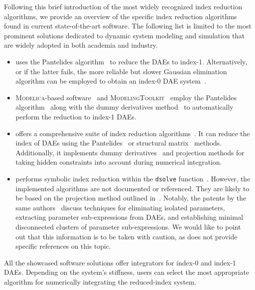 Following this brief introduction of the most widely recognized index reduction algorithms, we provide an overview of the specific index reduction algorithms found in current state-of-the-art software. The following list is limited to the most prominent solutions dedicated to dynamic system modeling and simulation that are widely adopted in both academia and industry.
%
\begin{itemize}
  \setlength{\itemsep}{0.0em}
  \item \Matlab{} uses the Pantelides algorithm~\cite{pantelides1988consistent} to reduce the \acp{DAE} to index-1. Alternatively, or if the latter fails, the more reliable but slower Gaussian elimination algorithm can be employed to obtain an index-0 \ac{DAE} system~\cite{matlab}.
  \item \textsc{Modelica}-based software~\cite{mattsson1997modelica, mattsson1998physical} and \textsc{ModelingToolkit}~\cite{modelingtoolkit} employ the Pantelides algorithm~\cite{pantelides1988consistent} along with the dummy derivatives method~\cite{mattsson1993index} to automatically perform the reduction to index-1 \acp{DAE}.
  \item \Mathematica{} offers a comprehensive suite of index reduction algorithms~\cite{mathematica}. It can reduce the index of \acp{DAE} using the Pantelides~\cite{pantelides1988consistent} or structural matrix~ \cite{unger1995structural, chowdhry2004symbolic} methods. Additionally, it implements dummy derivatives~\cite{mattsson1993index} and projection methods for taking hidden constraints into account during numerical integration.
  \item \Maple{} performs symbolic index reduction within the \texttt{dsolve} function~\cite{maple}. However, the implemented algorithms are not documented or referenced. They are likely to be based on the projection method outlined in~\cite{shmoylova2013simplification}. Notably, the patents by the same authors~\cite{postma2012exact, shmoylova2012method, postma2015exact} discuss techniques for eliminating isolated parameters, extracting parameter sub-expressions from \acp{DAE}, and establishing minimal disconnected clusters of parameter sub-expressions. We would like to point out that this information is to be taken with caution, as \Maple{} does not provide specific references on this topic.
\end{itemize}
%
All the showcased software solutions offer integrators for index-0 and index-1 \acp{DAE}. Depending on the system's stiffness, users can select the most appropriate algorithm for numerically integrating the reduced-index system.

